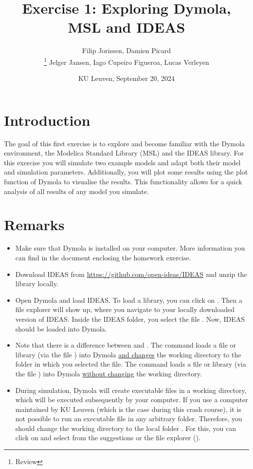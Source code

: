 \documentclass[10pt,a4paper]{article}
\begin{document}
\title{Exercise 1: Exploring Dymola, MSL and IDEAS}
\author{Filip Jorissen, Damien Picard \\  \thanks{Review} Jelger Jansen, Iago Cupeiro Figueroa, Lucas Verleyen}
\date{KU Leuven, September 20, 2024}
\maketitle

\doclicenseThis

\section*{Introduction}
The goal of this first exercise is to explore and become familiar with the Dymola environment, the Modelica Standard Library (MSL) and the IDEAS library. For this exercise you will simulate two example models and adapt both their model and simulation parameters. Additionally, you will plot some results using the plot function of Dymola to visualise the results. This functionality allows for a quick analysis of all results of any model you simulate. 

\section*{Remarks}
 
\begin{itemize}
	\item Make sure that Dymola is installed on your computer. More information you can find in the document enclosing the homework exercise.
	\item Download IDEAS from \href{https://github.com/open-ideas/IDEAS}{https://github.com/open-ideas/IDEAS} and unzip the library locally.
	\item Open Dymola and load IDEAS. To load a library, you can click on . Then a file explorer will show up, where you navigate to your locally downloaded version of IDEAS. Inside the IDEAS folder, you select the file . Now, IDEAS should be loaded into Dymola.
	\item Note that there is a difference between  and . The command  loads a file or library (via the file ) into Dymola \underline{and changes} the working directory to the folder in which you selected the file. The command  loads a file or library (via the file ) into Dymola \underline{without changing} the working directory.
	\item During simulation, Dymola will create executable files in a working directory, which will be executed subsequently by your computer. If you use a computer maintained by KU Leuven (which is the case during this crash course), it is not possible to run an executable file in any arbitrary folder. Therefore, you should change the working directory to the local folder . For this, you can click on  and select  from the suggestions or the file explorer ().
\end{itemize}
\end{document}
